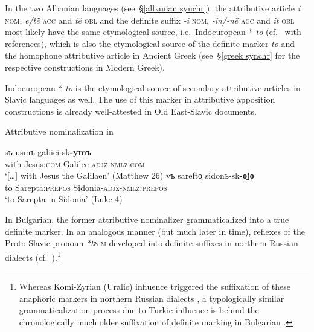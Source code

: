 {In the two Albanian languages (see~\S\ref{albanian synchr}), the attributive article \textit{i} \textsc{nom}, \textit{e/të} \textsc{acc} and \textit{të} \textsc{obl} and the definite suffix \textit{-i} \textsc{nom}, \textit{-in/-në} \textsc{acc} and \textit{it} \textsc{obl} most likely have the same etymological source, i.e.~Indoeuropean *\textit{-to} (cf.~\citet[165]{himmelmann1997} with references), which is also the etymological source of the definite marker \textit{to} and the homophone attributive article in Ancient Greek (see~\S\ref{greek synchr} for the respective constructions in Modern Greek).

Indoeuropean *\textit{-to} is the etymological source of secondary attributive articles in Slavic languages as well. The use of this marker in attributive apposition constructions is already well-attested in Old East-Slavic documents.
\begin{exe}
\ex Attributive nominalization in \\
\begin{xlist}
\ex
\gll	[\dots] sъ usmъ galiiei-sk\textbf{-ymъ}\\
	{ } with Jesus:\textsc{com} Galilee-\textsc{adjz}-\textsc{nmlz:com}\\
\glt 	‘[\dots] with Jesus the Galilaen’ (Matthew 26)
\ex 
\gll	vъ sarefto̜ sidonъ-sk\textbf{-o̜jo̜}\\
	to Sarepta:\textsc{prepos} Sidonia-\textsc{adjz}-\textsc{nmlz:prepos}\\
\glt 	‘to Sarepta in Sidonia’ (Luke 4)
\end{xlist}
\end{exe}
In Bulgarian, the former attributive nominalizer grammaticalized into a true definite marker. In an analogous manner (but much later in time), reflexes of the Proto-Slavic pronoun \textit{*tъ} \textsc{m} developed into definite suffixes in northern Russian dialects (cf.~\citealt
{leinonen2006a}).\footnote{Whereas Komi-Zyrian (Uralic) influence triggered the suffixation of these anaphoric markers in northern Russian dialects \citep
{leinonen2006a}, a typologically similar grammaticalization process due to Turkic influence is behind the chronologically much older suffixation of definite marking in Bulgarian \citep[114–122]{kusmenko2008}.}

}
